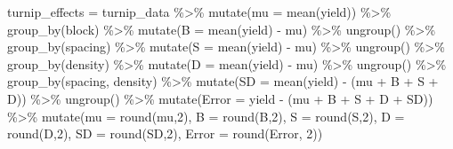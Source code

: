 \documentclass[
]{book}
\newenvironment{Shaded}{\begin{snugshade}}{\end{snugshade}}
\newcommand{\AttributeTok}[1]{\textcolor[rgb]{0.77,0.63,0.00}{#1}}
\newcommand{\DecValTok}[1]{\textcolor[rgb]{0.00,0.00,0.81}{#1}}
\newcommand{\FunctionTok}[1]{\textcolor[rgb]{0.00,0.00,0.00}{#1}}
\newcommand{\NormalTok}[1]{#1}
\newcommand{\OtherTok}[1]{\textcolor[rgb]{0.56,0.35,0.01}{#1}}
\newcommand{\SpecialCharTok}[1]{\textcolor[rgb]{0.00,0.00,0.00}{#1}}
\begin{document}
\begin{Shaded}
\begin{Highlighting}[]
\NormalTok{turnip\_effects }\OtherTok{=}\NormalTok{ turnip\_data }\SpecialCharTok{\%\textgreater{}\%}
  \FunctionTok{mutate}\NormalTok{(}\AttributeTok{mu =} \FunctionTok{mean}\NormalTok{(yield)) }\SpecialCharTok{\%\textgreater{}\%}
  \FunctionTok{group\_by}\NormalTok{(block) }\SpecialCharTok{\%\textgreater{}\%}
  \FunctionTok{mutate}\NormalTok{(}\AttributeTok{B =} \FunctionTok{mean}\NormalTok{(yield) }\SpecialCharTok{{-}}\NormalTok{ mu) }\SpecialCharTok{\%\textgreater{}\%}
  \FunctionTok{ungroup}\NormalTok{() }\SpecialCharTok{\%\textgreater{}\%}
  \FunctionTok{group\_by}\NormalTok{(spacing) }\SpecialCharTok{\%\textgreater{}\%}
  \FunctionTok{mutate}\NormalTok{(}\AttributeTok{S =} \FunctionTok{mean}\NormalTok{(yield) }\SpecialCharTok{{-}}\NormalTok{ mu) }\SpecialCharTok{\%\textgreater{}\%}
  \FunctionTok{ungroup}\NormalTok{() }\SpecialCharTok{\%\textgreater{}\%}
  \FunctionTok{group\_by}\NormalTok{(density) }\SpecialCharTok{\%\textgreater{}\%}
  \FunctionTok{mutate}\NormalTok{(}\AttributeTok{D =} \FunctionTok{mean}\NormalTok{(yield) }\SpecialCharTok{{-}}\NormalTok{ mu) }\SpecialCharTok{\%\textgreater{}\%}
  \FunctionTok{ungroup}\NormalTok{() }\SpecialCharTok{\%\textgreater{}\%}
  \FunctionTok{group\_by}\NormalTok{(spacing, density) }\SpecialCharTok{\%\textgreater{}\%}
  \FunctionTok{mutate}\NormalTok{(}\AttributeTok{SD =} \FunctionTok{mean}\NormalTok{(yield) }\SpecialCharTok{{-}}\NormalTok{ (mu }\SpecialCharTok{+}\NormalTok{ B }\SpecialCharTok{+}\NormalTok{ S }\SpecialCharTok{+}\NormalTok{ D)) }\SpecialCharTok{\%\textgreater{}\%}
  \FunctionTok{ungroup}\NormalTok{() }\SpecialCharTok{\%\textgreater{}\%}
  \FunctionTok{mutate}\NormalTok{(}\AttributeTok{Error =}\NormalTok{ yield }\SpecialCharTok{{-}}\NormalTok{ (mu }\SpecialCharTok{+}\NormalTok{ B }\SpecialCharTok{+}\NormalTok{ S }\SpecialCharTok{+}\NormalTok{ D }\SpecialCharTok{+}\NormalTok{ SD)) }\SpecialCharTok{\%\textgreater{}\%}
  \FunctionTok{mutate}\NormalTok{(}\AttributeTok{mu =} \FunctionTok{round}\NormalTok{(mu,}\DecValTok{2}\NormalTok{),}
         \AttributeTok{B =} \FunctionTok{round}\NormalTok{(B,}\DecValTok{2}\NormalTok{),}
         \AttributeTok{S =} \FunctionTok{round}\NormalTok{(S,}\DecValTok{2}\NormalTok{),}
         \AttributeTok{D =} \FunctionTok{round}\NormalTok{(D,}\DecValTok{2}\NormalTok{),}
         \AttributeTok{SD =} \FunctionTok{round}\NormalTok{(SD,}\DecValTok{2}\NormalTok{),}
         \AttributeTok{Error =} \FunctionTok{round}\NormalTok{(Error, }\DecValTok{2}\NormalTok{)) }
  

\end{Highlighting}
\end{Shaded}
\end{document}
